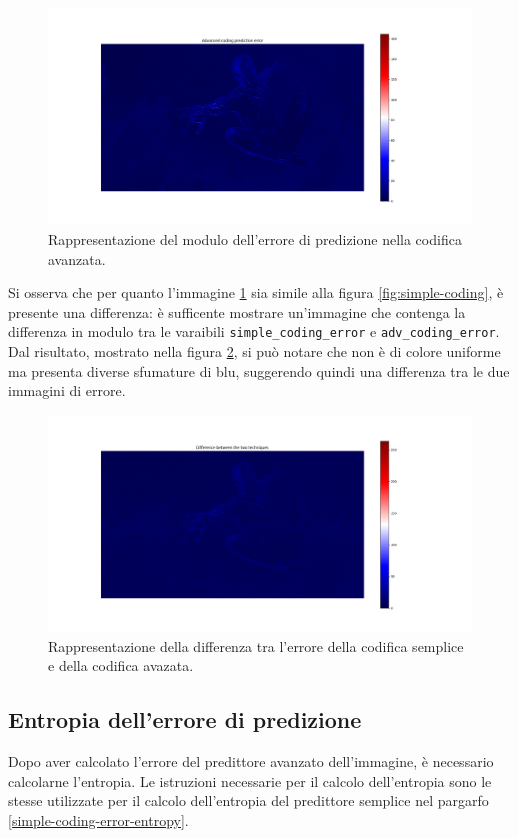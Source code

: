 \begin{figure}[h]
    \centering
    \includegraphics[width = .9\textwidth]{hw-1/report/imgs/advanced-coding.png}
    \caption{Rappresentazione del modulo dell'errore di predizione nella codifica avanzata.}
    \label{fig:advanced-coding}
\end{figure}

\FloatBarrier\noindent Si osserva che per quanto l'immagine \ref{fig:advanced-coding} sia simile alla figura \ref{fig:simple-coding}, è presente una differenza: è sufficente mostrare un'immagine che contenga la differenza in modulo tra le varaibili \texttt{simple\_coding\_error} e \texttt{adv\_coding\_error}. Dal risultato, mostrato nella figura \ref{fig:error-difference}, si può notare che non è di colore uniforme ma presenta diverse sfumature di blu, suggerendo quindi una differenza tra le due immagini di errore.

\begin{figure}[h]
    \centering
    \includegraphics[width = .9\textwidth]{hw-1/report/imgs/error-difference.png}
    \caption{Rappresentazione della differenza tra l'errore della codifica semplice e della codifica avazata.}
    \label{fig:error-difference}
\end{figure}



\vspace{15px}\subsection{Entropia dell'errore di predizione}
Dopo aver calcolato l'errore del predittore avanzato dell'immagine, è necessario calcolarne l'entropia. Le istruzioni necessarie per il calcolo dell'entropia sono le stesse utilizzate per il calcolo dell'entropia del predittore semplice nel pargarfo \ref{simple-coding-error-entropy}.



